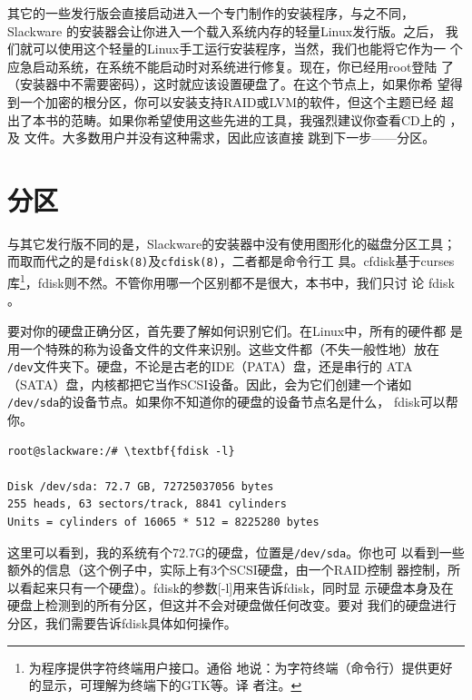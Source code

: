 其它的一些发行版会直接启动进入一个专门制作的安装程序，与之不同，
Slackware 的安装器会让你进入一个载入系统内存的轻量Linux发行版。之后，
我们就可以使用这个轻量的Linux手工运行安装程序，当然，我们也能将它作为一
个应急启动系统，在系统不能启动时对系统进行修复。现在，你已经用root登陆
了（安装器中不需要密码），这时就应该设置硬盘了。在这个节点上，如果你希
望得到一个加密的根分区，你可以安装支持RAID或LVM的软件，但这个主题已经
超出了本书的范畴。如果你希望使用这些先进的工具，我强烈建议你查看CD上的
，及
文件。大多数用户并没有这种需求，因此应该直接
跳到下一步——分区。

\section{分区}
\label{sec:installation:partition}

与其它发行版不同的是，Slackware的安装器中没有使用图形化的磁盘分区工具；
而取而代之的是\texttt{fdisk(8)}及\texttt{cfdisk(8)}，二者都是命令行工
具。cfdisk基于curses库\footnote{为程序提供字符终端用户接口。通俗
  地说：为字符终端（命令行）提供更好的显示，可理解为终端下的GTK等。译
  者注。}，fdisk则不然。不管你用哪一个区别都不是很大，本书中，我们只讨
论 fdisk 。

要对你的硬盘正确分区，首先要了解如何识别它们。在Linux中，所有的硬件都
是用一个特殊的称为设备文件的文件来识别。这些文件都（不失一般性地）放在
\texttt{/dev}文件夹下。硬盘，不论是古老的IDE（PATA）盘，还是串行的
ATA（SATA）盘，内核都把它当作SCSI设备。因此，会为它们创建一个诸如
\texttt{/dev/sda}的设备节点。如果你不知道你的硬盘的设备节点名是什么，
fdisk可以帮你。
\begin{Verbatim}[frame=single,commandchars=\\\{\}]
root@slackware:/# \textbf{fdisk -l}

Disk /dev/sda: 72.7 GB, 72725037056 bytes
255 heads, 63 sectors/track, 8841 cylinders
Units = cylinders of 16065 * 512 = 8225280 bytes
\end{Verbatim}
这里可以看到，我的系统有个72.7G的硬盘，位置是\texttt{/dev/sda}。你也可
以看到一些额外的信息（这个例子中，实际上有3个SCSI硬盘，由一个RAID控制
器控制，所以看起来只有一个硬盘）。fdisk的参数[-l]用来告诉fdisk，同时显
示硬盘本身及在硬盘上检测到的所有分区，但这并不会对硬盘做任何改变。要对
我们的硬盘进行分区，我们需要告诉fdisk具体如何操作。

